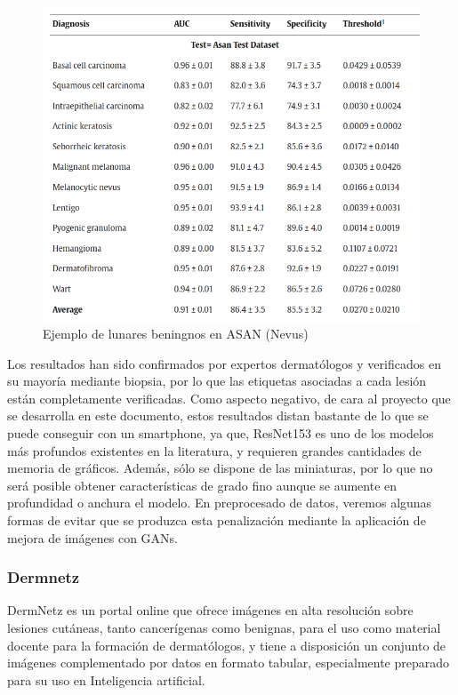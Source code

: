 \begin{figure}[H]
	\centering
	\includegraphics[scale = 0.4]{imagenes/results_asan.png}
	\caption{Ejemplo de lunares beningnos en ASAN (Nevus)}
\end{figure}

Los resultados han sido confirmados por expertos dermatólogos y verificados en su mayoría mediante biopsia, por lo que las etiquetas asociadas a cada lesión están completamente verificadas. Como aspecto negativo, de cara al proyecto que se desarrolla en este documento, estos resultados distan bastante de lo que se puede conseguir con un smartphone, ya que, ResNet153 es uno de los modelos más profundos existentes en la literatura, y requieren grandes cantidades de memoria de gráficos. Además, sólo se dispone de las miniaturas, por lo que no será posible obtener características de grado fino aunque se aumente en profundidad o anchura el modelo. En preprocesado de datos, veremos algunas formas de evitar que se produzca esta penalización mediante la aplicación de mejora de imágenes con GANs.

\subsubsection{Dermnetz}

DermNetz es un portal online que ofrece imágenes en alta resolución sobre lesiones cutáneas, tanto cancerígenas como benignas, para el uso como material docente para la formación de dermatólogos, y tiene a disposición un conjunto de imágenes complementado por datos en formato tabular, especialmente preparado para su uso en Inteligencia artificial.

